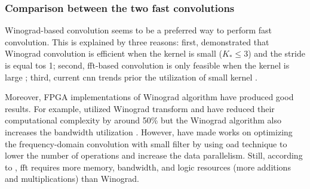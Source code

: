\subsubsection{Comparison between the two fast convolutions}
%
Winograd-based convolution seems to be a preferred way to perform fast convolution. This is explained by three reasons: first, \textcite{lavin_fast_2015} demonstrated that Winograd convolution is efficient when the kernel is small ($K_* \leq 3$) and the stride is equal tos 1; second, \acrshort{fft}-based convolution is only feasible when the kernel is large \cite{ahmad_towards_2019, chitsaz_acceleration_2020}; third, current \acrshort{cnn} trends prior the utilization of small kernel \cite{liang_evaluating_2020, sandler_mobilenetv2_2019}.

Moreover, FPGA implementations of Winograd algorithm have produced good results. For example, \cite{aydonat_opencl_2017, liang_evaluating_2020} utilized Winograd transform and have reduced their computational complexity by around 50\% but the Winograd algorithm also increases the bandwidth utilization \cite{xiao_exploring_2017}. However, \textcite{zeng_optimizing_nodate, chitsaz_acceleration_2020, liang_evaluating_2020} have made works on optimizing the frequency-domain convolution with small filter by using \acrfull{oad} technique \cite{w_smith_scientist_1997} to lower the number of operations and increase the data parallelism. Still, according to \textcite{liang_evaluating_2020, podili_fast_2017}, \acrshort{fft} requires more memory, bandwidth, and logic resources (more additions and multiplications) than Winograd.
